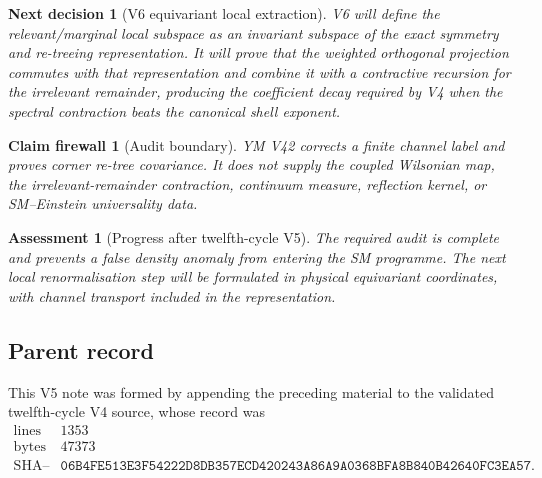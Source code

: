 \documentclass[11pt]{article}
\newtheorem{firewall}[theorem]{Claim firewall}
\newtheorem{decision}[theorem]{Next decision}
\newtheorem{assessment}[theorem]{Assessment}
\theoremstyle{remark}
\begin{document}
\begin{decision}[V6 equivariant local extraction]
\label{dec:v12v5-next}
V6 will define the relevant/marginal local subspace as an invariant
subspace of the exact symmetry and re-treeing representation.  It
will prove that the weighted orthogonal projection commutes with that
representation and combine it with a contractive recursion for the
irrelevant remainder, producing the coefficient decay required by
V4 when the spectral contraction beats the canonical shell exponent.
\end{decision}

\begin{firewall}[Audit boundary]
\label{fire:v12v5-boundary}
YM V42 corrects a finite channel label and proves corner re-tree
covariance.  It does not supply the coupled Wilsonian map, the
irrelevant-remainder contraction, continuum measure, reflection
kernel, or SM--Einstein universality data.
\end{firewall}

\begin{assessment}[Progress after twelfth-cycle V5]
\label{ass:v12v5-status}
The required audit is complete and prevents a false density anomaly
from entering the SM programme.  The next local renormalisation step
will be formulated in physical equivariant coordinates, with channel
transport included in the representation.
\end{assessment}

\subsection{Parent record}

This V5 note was formed by appending the preceding material to the
validated twelfth-cycle V4 source, whose record was
\[
\begin{array}{c|c}
\text{lines}&1353\\
\text{bytes}&47373\\
\text{SHA--256}&
\texttt{06B4FE513E3F54222D8DB357ECD420243A86A9A0368BFA8B840B42640FC3EA57}.
\end{array}                                                     \tag{5.4}
\]

\end{document}
